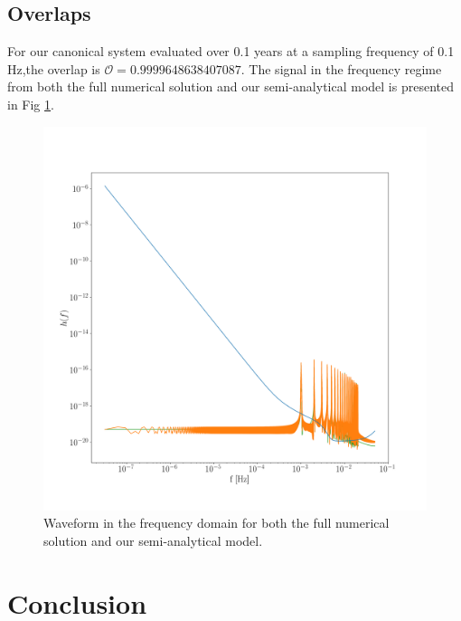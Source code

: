 \documentclass[a4paper,fleqn,usenatbib]{mnras}
\begin{document}
\subsection{Overlaps}
For our canonical system evaluated over 0.1 years at a sampling frequency of 0.1 Hz,the overlap is $\mathcal{O} = 0.9999648638407087$. The signal in the frequency regime from both the full numerical solution and our semi-analytical model is presented in Fig \ref{fig:overlap}.





\begin{figure}
	\includegraphics[width=\columnwidth]{GW_overlap.png}
	\caption{Waveform in the frequency domain for both the full numerical solution and our semi-analytical model.}
	\label{fig:overlap}
\end{figure}







\section{Conclusion}


\newpage
\appendix
\end{document}
